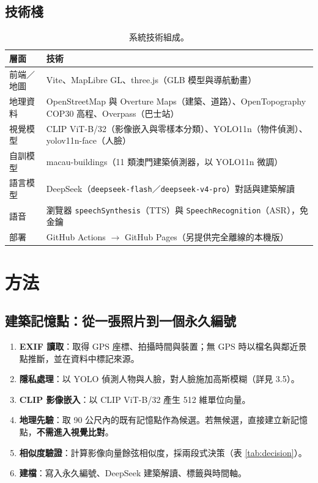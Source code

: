 \documentclass[11pt,a4paper,fontset=windows]{ctexart}
\begin{document}
\subsection{技術棧}
\begin{table}[H]
\centering\small
\begin{tabular}{@{}ll@{}}
\toprule
\textbf{層面} & \textbf{技術} \\
\midrule
前端／地圖 & Vite、MapLibre GL、three.js（GLB 模型與導航動畫） \\
地理資料 & OpenStreetMap 與 Overture Maps（建築、道路）、OpenTopography COP30 高程、Overpass（巴士站） \\
視覺模型 & CLIP ViT-B/32（影像嵌入與零樣本分類）、YOLO11n（物件偵測）、yolov11n-face（人臉） \\
自訓模型 & macau-buildings（11 類澳門建築偵測器，以 YOLO11n 微調） \\
語言模型 & DeepSeek（\texttt{deepseek-flash}／\texttt{deepseek-v4-pro}）對話與建築解讀 \\
語音 & 瀏覽器 \texttt{speechSynthesis}（TTS）與 \texttt{SpeechRecognition}（ASR），免金鑰 \\
部署 & GitHub Actions $\rightarrow$ GitHub Pages（另提供完全離線的本機版） \\
\bottomrule
\end{tabular}
\caption{系統技術組成。}
\end{table}

\section{方法}

\subsection{建築記憶點：從一張照片到一個永久編號}
\begin{enumerate}[leftmargin=1.4em,itemsep=2pt]
  \item \textbf{EXIF 讀取}：取得 GPS 座標、拍攝時間與裝置；無 GPS 時以檔名與鄰近景點推斷，並在資料中標記來源。
  \item \textbf{隱私處理}：以 YOLO 偵測人物與人臉，對人臉施加高斯模糊（詳見 3.5）。
  \item \textbf{CLIP 影像嵌入}：以 CLIP ViT-B/32 產生 512 維單位向量。
  \item \textbf{地理先驗}：取 90 公尺內的既有記憶點作為候選。若無候選，直接建立新記憶點，\textbf{不需進入視覺比對}。
  \item \textbf{相似度驗證}：計算影像向量餘弦相似度，採兩段式決策（表 \ref{tab:decision}）。
  \item \textbf{建檔}：寫入永久編號、DeepSeek 建築解讀、標籤與時間軸。
\end{enumerate}
\end{document}
